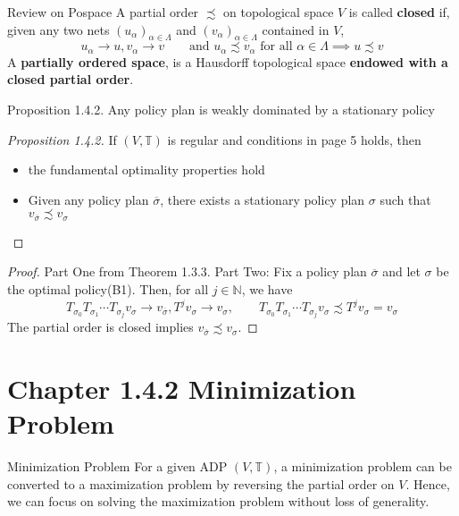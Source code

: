 \documentclass[aspectratio=169]{beamer} %
\begin{document}
\begin{frame}{Review on Pospace}
A partial order $\precsim$ on topological space $V$ is called \textbf{closed} if, given any two nets $(u_\alpha)_{\alpha\in\Lambda}$ and $(v_\alpha)_{\alpha\in\Lambda}$ contained in $V$,
$$
u_\alpha \to u, v_\alpha \to v\qquad \text{and $u_\alpha\precsim v_\alpha$ for all $\alpha \in\Lambda \implies u\precsim v$}
$$
A \textbf{partially ordered space}, is a Hausdorff topological space \textbf{endowed with a closed partial order}.
    
\end{frame}


\begin{frame}{Proposition 1.4.2. Any policy plan is weakly dominated by a stationary policy}
\begin{proof}[Proposition 1.4.2]
    If $(V,\mathbb{T})$ is regular and conditions in page 5 holds, then
    \begin{itemize}
        \item the fundamental optimality properties hold
        \item Given any policy plan $\overline{\sigma}$, there exists a stationary policy plan $\sigma$ such that $v_{\overline{\sigma}}\precsim v_\sigma$
    \end{itemize}
\end{proof}
\begin{proof}
    Part One from Theorem 1.3.3.
    Part Two:
    Fix a policy plan $\overline{\sigma}$ and let $\sigma$ be the optimal policy(B1). Then, for all $j\in\mathbb{N}$, we have
    $$
    T_{\sigma_0}T_{\sigma_1}\cdots T_{\sigma_j} v_\sigma\to v_{\overline{\sigma}}, T^j v_\sigma \to v_\sigma,\qquad  T_{\sigma_0}T_{\sigma_1}\cdots T_{\sigma_j} v_\sigma \precsim T^jv_\sigma = v_\sigma
    $$
    The partial order is closed implies $v_{\overline{\sigma}}\precsim v_{\sigma}$.
\end{proof}
\end{frame}
\section{Chapter 1.4.2 Minimization Problem}
\begin{frame}{Minimization Problem}
    For a given ADP $(V,\mathbb{T})$, a minimization problem can be converted to a maximization problem by reversing the partial order on $V$. Hence, we can focus on solving the maximization problem without loss of generality.
\end{frame}
\end{document}
